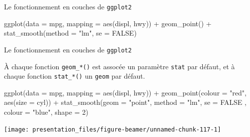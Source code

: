 \documentclass[12pt,ignorenonframetext,handout,]{beamer}
\newenvironment{Shaded}{}{}
\newcommand{\DataTypeTok}[1]{#1}
\newcommand{\DecValTok}[1]{#1}
\newcommand{\KeywordTok}[1]{\textcolor[rgb]{0.00,0.00,1.00}{#1}}
\newcommand{\NormalTok}[1]{#1}
\newcommand{\OperatorTok}[1]{#1}
\newcommand{\OtherTok}[1]{\textcolor[rgb]{1.00,0.25,0.00}{#1}}
\newcommand{\StringTok}[1]{\textcolor[rgb]{0.00,0.50,0.50}{#1}}
\renewenvironment{Shaded}{\begin{snugshade}}{\end{snugshade}}
\begin{document}
\begin{frame}[fragile]{\large Le fonctionnement en \og couches \fg{} de
\texttt{ggplot2}}
\begin{Shaded}
\begin{Highlighting}[]
\KeywordTok{ggplot}\NormalTok{(}\DataTypeTok{data =}\NormalTok{ mpg, }\DataTypeTok{mapping =} \KeywordTok{aes}\NormalTok{(displ, hwy)) }\OperatorTok{+}\StringTok{ }
\StringTok{  }\KeywordTok{geom_point}\NormalTok{() }\OperatorTok{+}\StringTok{ }\KeywordTok{stat_smooth}\NormalTok{(}\DataTypeTok{method =} \StringTok{"lm"}\NormalTok{, }\DataTypeTok{se =} \OtherTok{FALSE}\NormalTok{)}
\end{Highlighting}
\end{Shaded}

\end{frame}

\begin{frame}[fragile]{\large Le fonctionnement en \og couches \fg{} de
\texttt{ggplot2}}
\protect\hypertarget{le-fonctionnement-en-couches-de-ggplot2-5}{}

À chaque fonction \texttt{geom\_*()} est assocée un paramètre
\texttt{stat} par défaut, et à chaque fonction \texttt{stat\_*()} un
\texttt{geom} par défaut.

\footnotesize \center

\begin{Shaded}
\begin{Highlighting}[]
\KeywordTok{ggplot}\NormalTok{(}\DataTypeTok{data =}\NormalTok{ mpg, }\DataTypeTok{mapping =} \KeywordTok{aes}\NormalTok{(displ, hwy)) }\OperatorTok{+}\StringTok{ }
\StringTok{  }\KeywordTok{geom_point}\NormalTok{(}\DataTypeTok{colour =} \StringTok{"red"}\NormalTok{, }\KeywordTok{aes}\NormalTok{(}\DataTypeTok{size =}\NormalTok{ cyl)) }\OperatorTok{+}\StringTok{ }
\StringTok{  }\KeywordTok{stat_smooth}\NormalTok{(}\DataTypeTok{geom =} \StringTok{"point"}\NormalTok{, }\DataTypeTok{method =} \StringTok{"lm"}\NormalTok{, }\DataTypeTok{se =} \OtherTok{FALSE}
\NormalTok{    , }\DataTypeTok{colour =} \StringTok{"blue"}\NormalTok{, }\DataTypeTok{shape =} \DecValTok{2}\NormalTok{)}
\end{Highlighting}
\end{Shaded}

\texttt{[image: presentation\_files/figure-beamer/unnamed-chunk-117-1]}

\end{frame}
\end{document}

